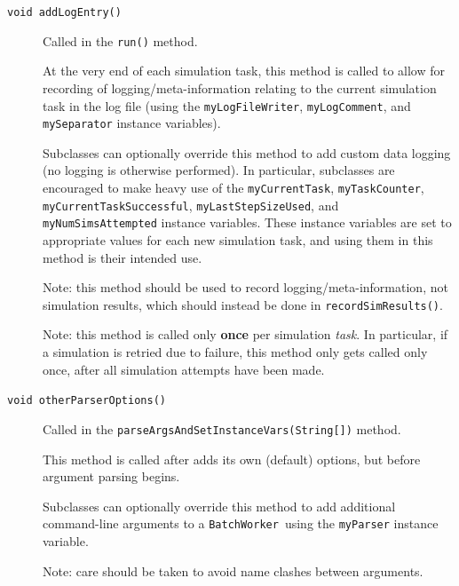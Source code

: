 \documentclass{article}
\newcommand{\BW}{{\tt BatchWorker}}
\begin{document}
\begin{description}

\item[{\tt void addLogEntry()} ] \mbox{}

Called in the {\tt run()} method.

At the very end of each simulation task, this method is called to allow for recording of logging/meta-information relating to the current simulation task in the log file (using the {\tt myLogFileWriter}, {\tt myLogComment}, and {\tt mySeparator} instance variables).

Subclasses can optionally override this method to add custom data logging (no logging is otherwise performed). In particular, subclasses are encouraged to make heavy use of the {\tt myCurrentTask}, {\tt myTaskCounter}, {\tt myCurrentTaskSuccessful}, {\tt myLastStepSizeUsed}, and {\tt myNumSimsAttempted} instance variables. These instance variables are set to appropriate values for each new simulation task, and using them in this method is their intended use.

\begin{sideblock}
Note: this method should be used to record logging/meta-information, not simulation results, which should instead be done in {\tt recordSimResults()}.
\end{sideblock}

\begin{sideblock}
Note: this method is called only \textbf{once} per simulation \textit{task}. In particular, if a simulation is retried due to failure, this method only gets called only once, after all simulation attempts have been made.
\end{sideblock}

\item[{\tt void otherParserOptions()} ] \mbox{}

Called in the {\tt parseArgsAndSetInstanceVars(String[])} method.

This method is called after  adds its own (default) options, but before argument parsing begins.

Subclasses can optionally override this method to add additional command-line arguments to a \BW\ using the {\tt myParser} instance variable.

\begin{sideblock}
Note: care should be taken to avoid name clashes between arguments.
\end{sideblock}


\end{description}
\end{document}
